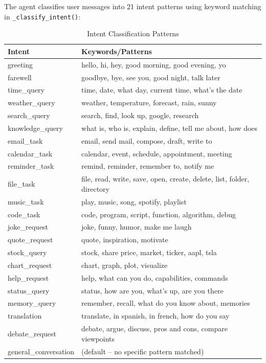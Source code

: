 \documentclass[12pt,a4paper,twoside]{report}
\begin{document}
The agent classifies user messages into 21 intent patterns using keyword matching in \texttt{\_classify\_intent()}:

\begin{table}[H]
\centering
\begin{tabularx}{\textwidth}{|l|X|}
\hline
\rowcolor{phiblue!20}
\textbf{Intent} & \textbf{Keywords/Patterns} \\
\hline
greeting & hello, hi, hey, good morning, good evening, yo \\
\hline
farewell & goodbye, bye, see you, good night, talk later \\
\hline
time\_query & time, date, what day, current time, what's the date \\
\hline
weather\_query & weather, temperature, forecast, rain, sunny \\
\hline
search\_query & search, find, look up, google, research \\
\hline
knowledge\_query & what is, who is, explain, define, tell me about, how does \\
\hline
email\_task & email, send mail, compose, draft, write to \\
\hline
calendar\_task & calendar, event, schedule, appointment, meeting \\
\hline
reminder\_task & remind, reminder, remember to, notify me \\
\hline
file\_task & file, read, write, save, open, create, delete, list, folder, directory \\
\hline
music\_task & play, music, song, spotify, playlist \\
\hline
code\_task & code, program, script, function, algorithm, debug \\
\hline
joke\_request & joke, funny, humor, make me laugh \\
\hline
quote\_request & quote, inspiration, motivate \\
\hline
stock\_query & stock, share price, market, ticker, aapl, tsla \\
\hline
chart\_request & chart, graph, plot, visualize \\
\hline
help\_request & help, what can you do, capabilities, commands \\
\hline
status\_query & status, how are you, what's up, are you there \\
\hline
memory\_query & remember, recall, what do you know about, memories \\
\hline
translation & translate, in spanish, in french, how do you say \\
\hline
debate\_request & debate, argue, discuss, pros and cons, compare viewpoints \\
\hline
general\_conversation & (default -- no specific pattern matched) \\
\hline
\end{tabularx}
\caption{Intent Classification Patterns}
\end{table}
\end{document}
